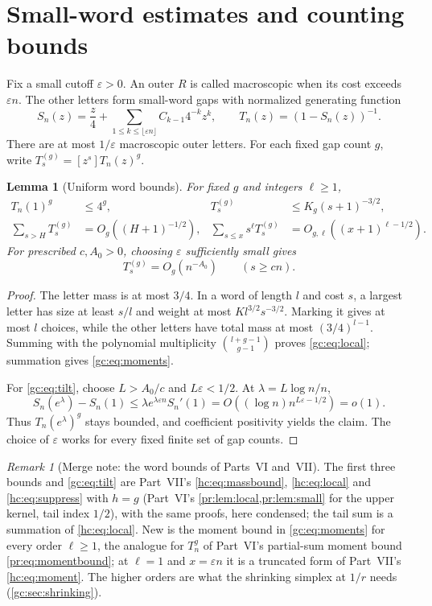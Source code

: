 \documentclass[11pt,a4paper]{article}
\newtheorem{lemma}[lemma]{Lemma}
\theoremstyle{definition}\newaliascnt{definition}{theorem}
\theoremstyle{remark}\newaliascnt{remark}{theorem}
\newtheorem{remark}[remark]{Remark}
\begin{document}
\section{Small-word estimates and counting bounds}
\label{gc:sec:smallwords}
Fix a small cutoff $\varepsilon>0$. An outer $R$ is called macroscopic when its
cost exceeds $\varepsilon n$. The other letters form small-word gaps with
normalized generating function
\[
 S_n(z)=\frac z4+\sum_{1\le k\le\lfloor\varepsilon n\rfloor}
                     C_{k-1}4^{-k}z^k,\qquad T_n(z)=(1-S_n(z))^{-1}.
\]
There are at most $1/\varepsilon$ macroscopic outer letters. For each fixed
gap count $g$, write $T^{(g)}_s=[z^s]T_n(z)^g$.

\begin{lemma}[Uniform word bounds]\label{gc:lem:words}
For fixed $g$ and integers $\ell\ge1$,
\begin{align}
 T_n(1)^g&\le4^g,&T^{(g)}_s&\le K_g(s+1)^{-3/2},\label{gc:eq:local}\\
 \sum_{s>H}T^{(g)}_s&=O_g((H+1)^{-1/2}),&
 \sum_{s\le x}s^\ell T^{(g)}_s&=O_{g,\ell}((x+1)^{\ell-1/2}).\label{gc:eq:moments}
\end{align}
For prescribed $c,A_0>0$, choosing $\varepsilon$ sufficiently small gives
\begin{equation}\label{gc:eq:tilt}
 T^{(g)}_s=O_g(n^{-A_0})\qquad(s\ge cn).
\end{equation}
\end{lemma}
\begin{proof}
The letter mass is at most $3/4$. In a word of length $l$ and cost $s$, a
largest letter has size at least $s/l$ and weight at most $Kl^{3/2}s^{-3/2}$.
Marking it gives at most $l$ choices, while the other letters have total mass
at most $(3/4)^{l-1}$. Summing with the polynomial multiplicity
$\binom{l+g-1}{g-1}$ proves \eqref{gc:eq:local}; summation gives
\eqref{gc:eq:moments}.

For \eqref{gc:eq:tilt}, choose $L>A_0/c$ and $L\varepsilon<1/2$. At
$\lambda=L\log n/n$,
\[
 S_n(e^\lambda)-S_n(1)
 \le\lambda e^{\lambda\varepsilon n}S_n'(1)
 =O((\log n)n^{L\varepsilon-1/2})=o(1).
\]
Thus $T_n(e^\lambda)^g$ stays bounded, and coefficient positivity yields the
claim. The choice of $\varepsilon$ works for every fixed finite set of gap
counts.
\end{proof}

\begin{remark}[Merge note: the word bounds of Parts~VI and~VII]
The first three bounds and \eqref{gc:eq:tilt} are Part~VII's
\eqref{hc:eq:massbound}, \eqref{hc:eq:local} and \eqref{hc:eq:suppress} with
$h=g$ (Part~VI's \cref{pr:lem:local,pr:lem:small} for the upper kernel, tail
index $1/2$), with the same proofs, here condensed; the tail sum is a summation
of \eqref{hc:eq:local}. New is the moment bound in \eqref{gc:eq:moments} for
every order $\ell\ge1$, the analogue for $T_n^g$ of Part~VI's partial-sum
moment bound \eqref{pr:eq:momentbound}; at $\ell=1$ and $x=\varepsilon n$ it
is a truncated form of Part~VII's \eqref{hc:eq:moment}. The higher orders are
what the shrinking simplex at $1/r$ needs (\cref{gc:sec:shrinking}).
\end{remark}
\end{document}
